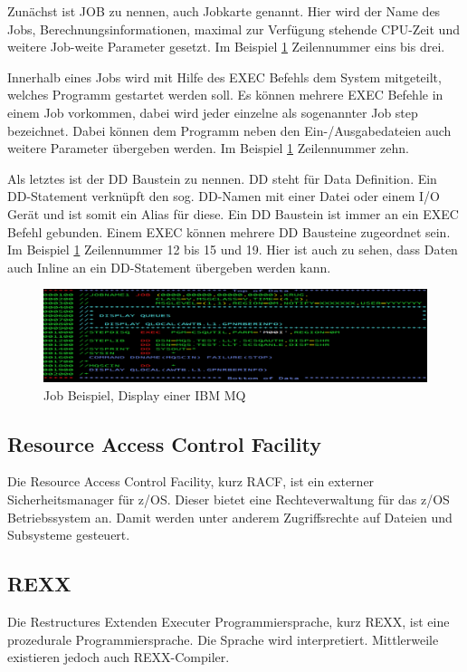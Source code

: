 Zunächst ist \glqq JOB\grqq{} zu nennen, auch Jobkarte genannt.
Hier wird der Name des Jobs, Berechnungsinformationen, maximal zur Verfügung stehende CPU-Zeit und weitere Job-weite Parameter gesetzt.
Im Beispiel \ref{fig:jclBsp} Zeilennummer eins bis drei.

Innerhalb eines Jobs wird mit Hilfe des \glqq EXEC\grqq{} Befehls dem System mitgeteilt, welches Programm gestartet werden soll.
Es können mehrere \glqq EXEC\grqq{}  Befehle in einem Job vorkommen, dabei wird jeder einzelne als sogenannter \glqq Job step\grqq{} bezeichnet.
Dabei können dem Programm neben den Ein-/Ausgabedateien auch weitere Parameter übergeben werden.
Im Beispiel \ref{fig:jclBsp} Zeilennummer zehn.

Als letztes ist der \glqq DD\grqq{} Baustein zu nennen.
\glqq DD\grqq{} steht für Data Definition.
Ein DD-Statement verknüpft den sog. DD-Namen mit einer Datei oder einem I/O Gerät und ist somit ein Alias für diese.
Ein \glqq DD\grqq{} Baustein ist immer an ein \glqq EXEC\grqq{} Befehl gebunden.
Einem \glqq EXEC\grqq{} können mehrere \glqq DD\grqq{} Bausteine zugeordnet sein. 
Im Beispiel \ref{fig:jclBsp} Zeilennummer 12 bis 15 und 19.
Hier ist auch zu sehen, dass Daten auch Inline an ein DD-Statement übergeben werden kann.
\cite{Ebbers.2011}

\begin{figure}[h]
\centering
\includegraphics[width=\textwidth]{figures/dispq.PNG}
\caption{Job Beispiel, Display einer IBM MQ}
\label{fig:jclBsp}
\end{figure}

\subsection{Resource Access Control Facility}
Die Resource Access Control Facility, kurz RACF, ist ein externer Sicherheitsmanager für z/OS.
Dieser bietet eine Rechteverwaltung für das z/OS Betriebssystem an.
Damit werden unter anderem Zugriffsrechte auf Dateien und Subsysteme gesteuert.
\cite{InternationalBusinessMachinesCorporation.2008}

\subsection{REXX}
Die Restructures Extenden Executer Programmiersprache, kurz REXX, ist eine prozedurale Programmiersprache.
Die Sprache wird interpretiert.
Mittlerweile existieren jedoch auch REXX-Compiler.
\cite{Parziale.2007}

